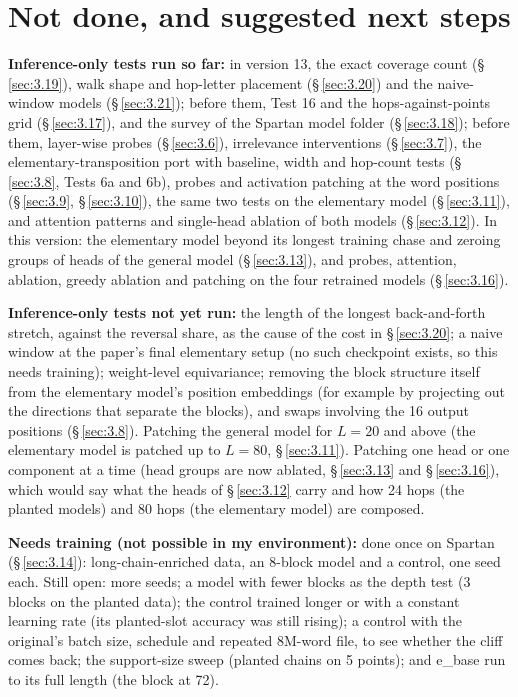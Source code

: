 \documentclass[paper=a4,fontsize=11pt,DIV=11,parskip=half,headings=small,numbers=noendperiod]{scrartcl}
\DeclareRobustCommand{\lead}[1]{\textsf{\bfseries\color{accent}#1}}
\DeclareRobustCommand{\code}[1]{{\fontseries{m}\ttfamily #1}}
\begin{document}
\section{Not done, and suggested next steps}\label{sec:6}
\lead{Inference-only tests run so far:} in version 13, the exact coverage count (\S\,\ref{sec:3.19}), walk shape
and hop-letter placement (\S\,\ref{sec:3.20}) and the naive-window models (\S\,\ref{sec:3.21}); before them,
Test 16 and the hops-against-points grid (\S\,\ref{sec:3.17}), and the survey of the Spartan model folder
(\S\,\ref{sec:3.18}); before them, layer-wise probes (\S\,\ref{sec:3.6}), irrelevance interventions
(\S\,\ref{sec:3.7}), the elementary-transposition port with baseline, width and hop-count tests
(\S\,\ref{sec:3.8}, Tests 6a and 6b), probes and activation patching at the word positions (\S\,\ref{sec:3.9},
\S\,\ref{sec:3.10}), the same two tests on the elementary model (\S\,\ref{sec:3.11}), and attention patterns and
single-head ablation of both models (\S\,\ref{sec:3.12}). In this version: the elementary model beyond its
longest training chase and zeroing groups of heads of the general model (\S\,\ref{sec:3.13}), and probes,
attention, ablation, greedy ablation and patching on the four retrained models (\S\,\ref{sec:3.16}).

\lead{Inference-only tests not yet run:} the length of the longest back-and-forth stretch, against the reversal
share, as the cause of the cost in \S\,\ref{sec:3.20}; a naive window at the paper’s final elementary setup (no
such checkpoint exists, so this needs training); weight-level equivariance; removing the block structure itself
from the elementary model’s position embeddings (for example by projecting out the directions that separate the
blocks), and swaps involving the 16 output positions (\S\,\ref{sec:3.8}). Patching the general model for $L=20$
and above (the elementary model is patched up to $L=80$, \S\,\ref{sec:3.11}). Patching one head or one component
at a time (head groups are now ablated, \S\,\ref{sec:3.13} and \S\,\ref{sec:3.16}), which would say what the
heads of \S\,\ref{sec:3.12} carry and how 24 hops (the planted models) and 80 hops (the elementary model) are
composed.

\lead{Needs training (not possible in my environment):} done once on Spartan (\S\,\ref{sec:3.14}):
long-chain-enriched data, an 8-block model and a control, one seed each. Still open: more seeds; a model with
fewer blocks as the depth test (3 blocks on the planted data); the control trained longer or with a constant
learning rate (its planted-slot accuracy was still rising); a control with the original’s batch size, schedule
and repeated 8M-word file, to see whether the cliff comes back; the support-size sweep (planted chains on 5
points); and \code{e\_\allowbreak{}base} run to its full length (the block at 72).
\end{document}
